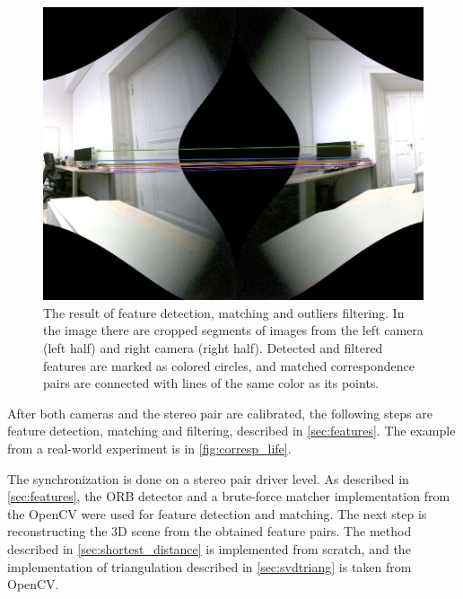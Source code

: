\begin{figure}[ht]
  \centering
  \includegraphics[width=1\textwidth]{graphics/corresp.png}
  \caption[The result of features detection, matching and outliers filtering.]{The result of feature detection, matching and outliers filtering. In the image there are cropped segments of images from the left camera (left half) and right camera (right half). Detected and filtered features are marked as colored circles, and matched correspondence pairs are connected with lines of the same color as its points.}
  \label{fig:corresp_life}
\end{figure}

After both cameras and the stereo pair are calibrated, the following steps are feature detection, matching and filtering, described in \autoref{sec:features}.
The example from a real-world experiment is in \autoref{fig:corresp_life}.

The synchronization is done on a stereo pair driver level.
As described in \autoref{sec:features}, the ORB detector and a brute-force matcher implementation from the OpenCV were used for feature detection and matching.
The next step is reconstructing the 3D scene from the obtained feature pairs.
The method described in \autoref{sec:shortest_distance} is implemented from scratch, and the implementation of triangulation described in \autoref{sec:svdtriang} is taken from OpenCV.


